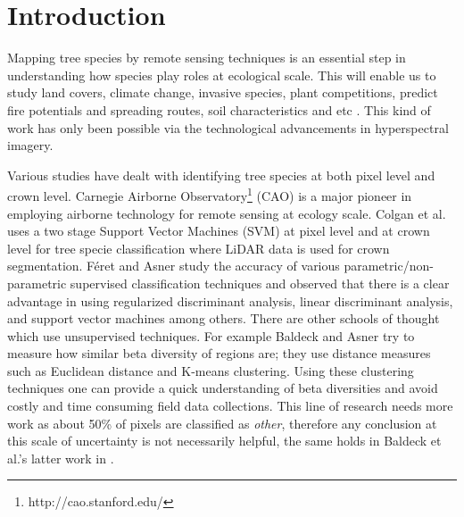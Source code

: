 \documentclass[remotesensing,article,accept,moreauthors,pdftex,12pt,a4paper]{mdpi}
\begin{document}
\section{Introduction}




Mapping tree species by remote sensing techniques is an essential step in understanding how species play roles at ecological scale. This will enable us to study land covers, climate change, invasive species, plant competitions, predict fire potentials and spreading routes, soil characteristics and etc \cite{scholes1997tree, colgan2012mapping}. This kind of work has only been possible via the technological advancements in hyperspectral imagery. 

Various studies have dealt with identifying tree species at both pixel level and crown level. 
Carnegie Airborne Observatory\footnote{http://cao.stanford.edu/} (CAO)  is a major pioneer in employing airborne technology for remote sensing at ecology scale. Colgan et al. \cite{colgan2012mapping} uses a two stage Support Vector Machines (SVM) at pixel level and at crown level for tree specie classification where LiDAR data is used for crown segmentation. F\'{e}ret and Asner \cite{feret2013tree} study the accuracy of various parametric/non-parametric supervised classification techniques and observed that there is a clear advantage in using regularized discriminant analysis, linear discriminant analysis, and support vector machines among others. There are other schools of thought which use unsupervised techniques. For example Baldeck and Asner \cite{baldeck2013estimating} try to measure how similar beta diversity of regions are; they use distance measures such as Euclidean distance and K-means clustering. Using these clustering techniques one can provide a quick understanding of beta diversities and avoid costly and time consuming field data collections. This line of research needs more work as about 50\% of pixels are classified as \textit{other}, therefore any conclusion at this scale of uncertainty is not necessarily helpful, the same holds in Baldeck et al.'s latter work in \cite{baldeck2014landscape}.
\end{document}
